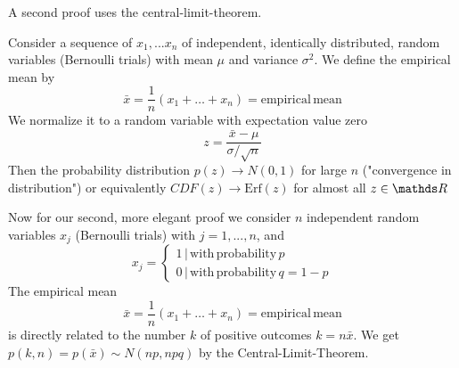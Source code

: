 \documentclass{notebook}
\begin{document}
A second proof uses the central-limit-theorem.

\begin{theorem}
	Consider a sequence of $x_1, ... x_n$ of independent, identically distributed, random variables (Bernoulli trials)
	with mean $\mu$ and variance $\sigma^2$. We define the empirical mean by
	\begin{equation}
	\bar{x} = \frac{1}{n}(x_1 + \dots + x_n) = \mathrm{empirical \, mean}
	\end{equation}
	We normalize it to a random variable with expectation value zero
	\begin{equation}
	z = \frac{\bar{x}-\mu}{\sigma/\sqrt{n}}
	\end{equation}
	Then the probability distribution $p(z) \to N(0,1)$ for large $n$ ("convergence in distribution") or equivalently $CDF(z) \to \mathrm{Erf}(z)$ for almost all $z \in \R$	
\end{theorem}

Now for our second, more elegant proof we consider $n$ independent random variables $x_j$ (Bernoulli trials) with $j = 1,...,n$, and
%
\begin{equation}
x_j = \begin{cases} 1 \, | \, \mathrm{with \, probability \,} p \\ 0 \, | \, \mathrm{with \, probability \, } q = 1 - p \end{cases}
\end{equation}
%
The empirical mean
%
\begin{equation}
\bar{x} = \frac{1}{n}(x_1 + \dots + x_n) = \mathrm{empirical \, mean}
\end{equation}
%
is directly related to the number $k$ of positive outcomes $k = n\bar{x}$. We get $p(k,n) = p(\bar{x}) \sim N(np,npq)$ by the Central-Limit-Theorem. 
\end{document}

